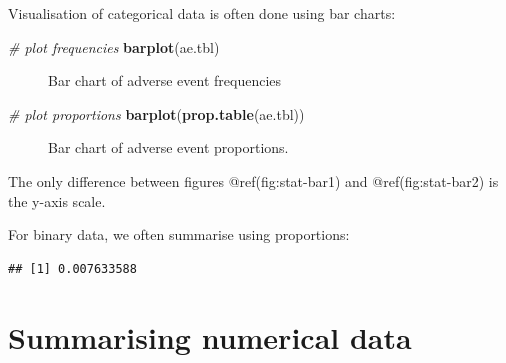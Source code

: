 \documentclass[
]{book}
\makeatletter
\newenvironment{Shaded}{\begin{snugshade}}{\end{snugshade}}
\newcommand{\CommentTok}[1]{\textcolor[rgb]{0.56,0.35,0.01}{\textit{#1}}}
\newcommand{\FunctionTok}[1]{\textcolor[rgb]{0.13,0.29,0.53}{\textbf{#1}}}
\newcommand{\NormalTok}[1]{#1}
\newcommand{\SpecialCharTok}[1]{\textcolor[rgb]{0.81,0.36,0.00}{\textbf{#1}}}
\newcommand{\StringTok}[1]{\textcolor[rgb]{0.31,0.60,0.02}{#1}}
\newcommand*\pandocbounded[1]{%
  \sbox\pandoc@box{#1}%
  \Gscale@div\@tempa{\textheight}{\dimexpr\ht\pandoc@box+\dp\pandoc@box\relax}%
  \Gscale@div\@tempb{\linewidth}{\wd\pandoc@box}%
  \ifdim\@tempb\p@<\@tempa\p@\let\@tempa\@tempb\fi%
  \ifdim\@tempa\p@<\p@\scalebox{\@tempa}{\usebox\pandoc@box}%
  \else\usebox{\pandoc@box}%
  \fi%
}
\makeatother
\begin{document}
Visualisation of categorical data is often done using bar charts:

\begin{Shaded}
\begin{Highlighting}[]
\CommentTok{\# plot frequencies}
\FunctionTok{barplot}\NormalTok{(ae.tbl)}
\end{Highlighting}
\end{Shaded}

\begin{figure}
\centering
\pandocbounded{}
\caption{Bar chart of adverse event frequencies}
\end{figure}

\begin{Shaded}
\begin{Highlighting}[]
\CommentTok{\# plot proportions}
\FunctionTok{barplot}\NormalTok{(}\FunctionTok{prop.table}\NormalTok{(ae.tbl))}
\end{Highlighting}
\end{Shaded}

\begin{figure}
\centering
\pandocbounded{}
\caption{Bar chart of adverse event proportions.}
\end{figure}

The only difference between figures @ref(fig:stat-bar1) and
@ref(fig:stat-bar2) is the y-axis scale.

For binary data, we often summarise using proportions:

\begin{Shaded}
\end{Shaded}

\begin{verbatim}
## [1] 0.007633588
\end{verbatim}

\section{Summarising numerical data}\label{summarising-numerical-data}
\end{document}
